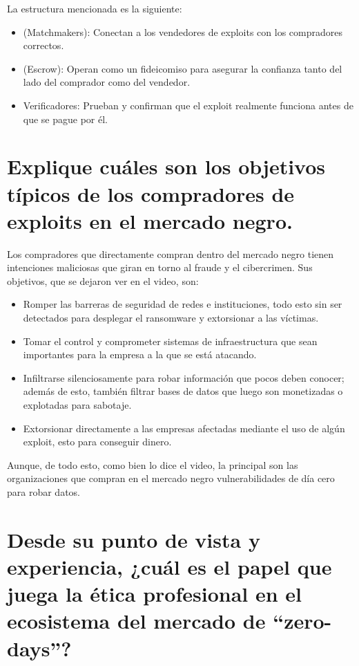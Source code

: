 \documentclass[letterpaper,11pt]{article}
\begin{document}
\begin{itemize}
    La estructura mencionada es la siguiente:

    \begin{itemize}
        \item (Matchmakers): Conectan a los vendedores de exploits con los compradores correctos.

        \item (Escrow): Operan como un fideicomiso para asegurar la confianza tanto del lado del comprador como del vendedor.

        \item Verificadores: Prueban y confirman que el exploit realmente funciona antes de que se pague por él.
    \end{itemize}
\end{itemize}

\section{Explique cuáles son los objetivos típicos de los compradores de exploits en el mercado negro. }


Los compradores que directamente compran 
dentro del mercado negro tienen intenciones 
maliciosas que giran en torno al fraude 
y el cibercrimen. Sus objetivos, que se dejaron ver en el video, son:

\begin{itemize}
    \item Romper las barreras de seguridad 
    de redes e instituciones, todo esto 
    sin ser detectados para desplegar 
    el ransomware y extorsionar a las víctimas.
    \item Tomar el control y comprometer 
    sistemas de infraestructura que sean importantes para la empresa a la que se está atacando. 
    \item Infiltrarse silenciosamente para robar información que pocos deben conocer; además de esto, 
    también filtrar bases de datos que luego 
    son monetizadas o explotadas para sabotaje.
    \item Extorsionar directamente a las empresas afectadas 
    mediante el uso de algún exploit, esto para conseguir dinero.
\end{itemize}

Aunque, de todo esto, como bien lo dice el video, la principal son las organizaciones que compran en el mercado negro 
vulnerabilidades de día cero para robar datos.

\newpage
\section{Desde su punto de vista y experiencia, ¿cuál es el papel que juega la ética profesional en el ecosistema del mercado de “zero-days”? }
\end{document}
